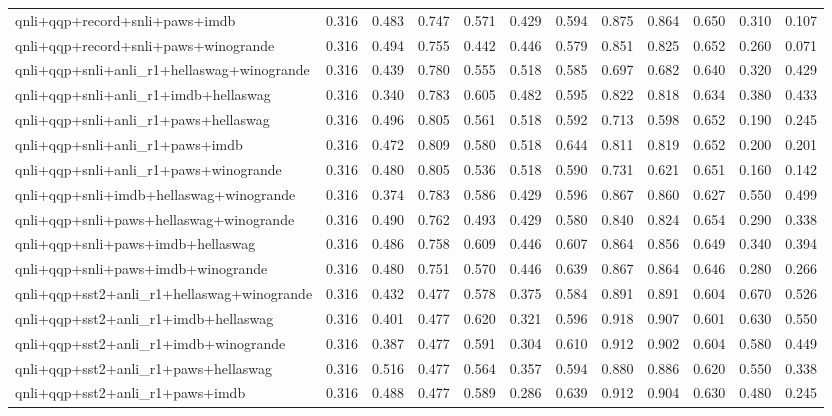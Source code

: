 \begin{table}[t]
\begin{tabular}{lrrrrrrrrrrr}
    qnli+qqp+record+snli+paws+imdb & 0.316 & 0.483 & 0.747 & 0.571 & 0.429 & 0.594 & 0.875 & 0.864 & 0.650 & 0.310 & 0.107 \\
    qnli+qqp+record+snli+paws+winogrande & 0.316 & 0.494 & 0.755 & 0.442 & 0.446 & 0.579 & 0.851 & 0.825 & 0.652 & 0.260 & 0.071 \\
    qnli+qqp+snli+anli\_r1+hellaswag+winogrande & 0.316 & 0.439 & 0.780 & 0.555 & 0.518 & 0.585 & 0.697 & 0.682 & 0.640 & 0.320 & 0.429 \\
    qnli+qqp+snli+anli\_r1+imdb+hellaswag & 0.316 & 0.340 & 0.783 & 0.605 & 0.482 & 0.595 & 0.822 & 0.818 & 0.634 & 0.380 & 0.433 \\
    qnli+qqp+snli+anli\_r1+paws+hellaswag & 0.316 & 0.496 & 0.805 & 0.561 & 0.518 & 0.592 & 0.713 & 0.598 & 0.652 & 0.190 & 0.245 \\
    qnli+qqp+snli+anli\_r1+paws+imdb & 0.316 & 0.472 & 0.809 & 0.580 & 0.518 & 0.644 & 0.811 & 0.819 & 0.652 & 0.200 & 0.201 \\
    qnli+qqp+snli+anli\_r1+paws+winogrande & 0.316 & 0.480 & 0.805 & 0.536 & 0.518 & 0.590 & 0.731 & 0.621 & 0.651 & 0.160 & 0.142 \\
    qnli+qqp+snli+imdb+hellaswag+winogrande & 0.316 & 0.374 & 0.783 & 0.586 & 0.429 & 0.596 & 0.867 & 0.860 & 0.627 & 0.550 & 0.499 \\
    qnli+qqp+snli+paws+hellaswag+winogrande & 0.316 & 0.490 & 0.762 & 0.493 & 0.429 & 0.580 & 0.840 & 0.824 & 0.654 & 0.290 & 0.338 \\
    qnli+qqp+snli+paws+imdb+hellaswag & 0.316 & 0.486 & 0.758 & 0.609 & 0.446 & 0.607 & 0.864 & 0.856 & 0.649 & 0.340 & 0.394 \\
    qnli+qqp+snli+paws+imdb+winogrande & 0.316 & 0.480 & 0.751 & 0.570 & 0.446 & 0.639 & 0.867 & 0.864 & 0.646 & 0.280 & 0.266 \\
    qnli+qqp+sst2+anli\_r1+hellaswag+winogrande & 0.316 & 0.432 & 0.477 & 0.578 & 0.375 & 0.584 & 0.891 & 0.891 & 0.604 & 0.670 & 0.526 \\
    qnli+qqp+sst2+anli\_r1+imdb+hellaswag & 0.316 & 0.401 & 0.477 & 0.620 & 0.321 & 0.596 & 0.918 & 0.907 & 0.601 & 0.630 & 0.550 \\
    qnli+qqp+sst2+anli\_r1+imdb+winogrande & 0.316 & 0.387 & 0.477 & 0.591 & 0.304 & 0.610 & 0.912 & 0.902 & 0.604 & 0.580 & 0.449 \\
    qnli+qqp+sst2+anli\_r1+paws+hellaswag & 0.316 & 0.516 & 0.477 & 0.564 & 0.357 & 0.594 & 0.880 & 0.886 & 0.620 & 0.550 & 0.338 \\
    qnli+qqp+sst2+anli\_r1+paws+imdb & 0.316 & 0.488 & 0.477 & 0.589 & 0.286 & 0.639 & 0.912 & 0.904 & 0.630 & 0.480 & 0.245 \\

\end{tabular}
\end{table}
